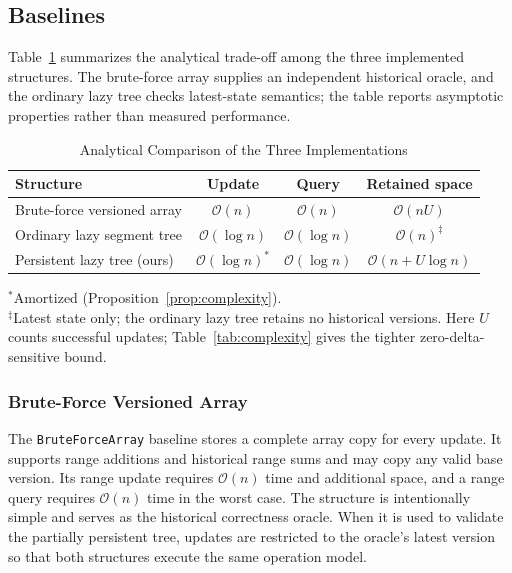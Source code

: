 \documentclass[conference]{IEEEtran}
\begin{document}
\subsection{Baselines}
\label{sec:baselines}

Table~\ref{tab:baseline_complexity} summarizes the analytical trade-off among the three
implemented structures. The brute-force array supplies an independent historical oracle, and the
ordinary lazy tree checks latest-state semantics; the table reports asymptotic properties rather
than measured performance.

\begin{table}[!t]
\caption{Analytical Comparison of the Three Implementations}
\label{tab:baseline_complexity}
\centering
\footnotesize
\renewcommand{\arraystretch}{1.25}
\begin{tabular}{@{}lccc@{}}
\toprule
\textbf{Structure} & \textbf{Update} & \textbf{Query} & \textbf{Retained space} \\
\midrule
Brute-force versioned array & $\mathcal{O}(n)$ & $\mathcal{O}(n)$ & $\mathcal{O}(nU)$ \\
Ordinary lazy segment tree & $\mathcal{O}(\log n)$ & $\mathcal{O}(\log n)$ &
$\mathcal{O}(n)^{\ddagger}$ \\
Persistent lazy tree (ours) & $\mathcal{O}(\log n)^{*}$ & $\mathcal{O}(\log n)$ &
$\mathcal{O}(n + U\log n)$ \\
\bottomrule
\end{tabular}

\vspace{2pt}
\raggedright\footnotesize
$^{*}$Amortized (Proposition~\ref{prop:complexity}).\\
$^{\ddagger}$Latest state only; the ordinary lazy tree retains no historical versions. Here $U$
counts successful updates; Table~\ref{tab:complexity} gives the tighter zero-delta-sensitive bound.
\end{table}

\subsubsection{Brute-Force Versioned Array}
The \texttt{BruteForceArray} baseline stores a complete array copy for every update. It supports
range additions and historical range sums and may copy any valid base version. Its range update
requires $\mathcal{O}(n)$ time and additional space, and a range query requires $\mathcal{O}(n)$
time in the worst case. The structure is intentionally simple and serves as the historical
correctness oracle. When it is used to validate the partially persistent tree, updates are
restricted to the oracle's latest version so that both structures execute the same operation
model.
\end{document}
